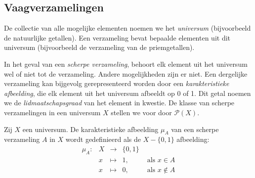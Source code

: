 
\subsection{Vaagverzamelingen}

De collectie van alle mogelijke elementen noemen we het \emph{universum} (bijvoorbeeld de
natuurlijke getallen). Een verzameling bevat bepaalde elementen uit dit universum (bijvoorbeeld de 
verzameling van de priemgetallen). 

In het geval van een \emph{scherpe verzameling}, behoort elk 
element uit het universum wel of niet tot de verzameling. Andere mogelijkheden zijn er
niet. Een dergelijke verzameling kan bijgevolg 
gerepresenteerd worden door een \emph{karakteristieke afbeelding}, die elk element uit het 
universum afbeeldt op 0 of 1. Dit getal noemen we de \emph{lidmaatschapsgraad} van het element 
in kwestie. De klasse van scherpe verzamelingen in een universum $X$ stellen we voor door 
$\mathcal{P}(X)$.
\begin{definitie}
Zij $X$ een universum. De karakteristieke afbeelding $\mu_A$ van een scherpe verzameling $A$ in $X$
wordt gedefinieerd als de $X - \{0,1\}$ afbeelding:
$$
\begin{array}{lllll}
\mu_A: 	& X & \to 		& \{0,1\}	& \\
		& x & \mapsto 	& 1,		& \textrm{ als } x \in A \\
		& x & \mapsto 	& 0,		& \textrm{ als } x \notin A
\end{array}
$$
\end{definitie}

